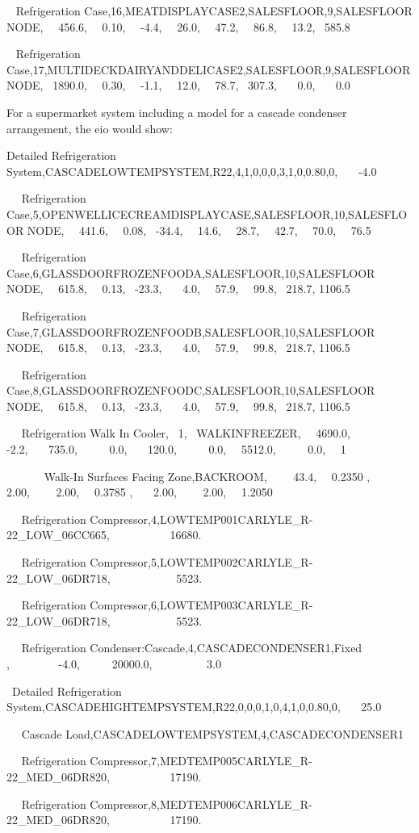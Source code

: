 ~ Refrigeration Case,16,MEATDISPLAYCASE2,SALESFLOOR,9,SALESFLOOR NODE,~~ 456.6,~~ 0.10,~~ -4.4,~~ 26.0,~~ 47.2,~~ 86.8,~~ 13.2,~ 585.8

~ Refrigeration Case,17,MULTIDECKDAIRYANDDELICASE2,SALESFLOOR,9,SALESFLOOR NODE,~ 1890.0,~~ 0.30,~~ -1.1,~~ 12.0,~~ 78.7,~ 307.3,~~~ 0.0,~~~ 0.0

For a supermarket system including a model for a cascade condenser arrangement, the eio would show:

Detailed Refrigeration System,CASCADELOWTEMPSYSTEM,R22,4,1,0,0,0,3,1,0,0.80,0,~~~ -4.0

~~ Refrigeration Case,5,OPENWELLICECREAMDISPLAYCASE,SALESFLOOR,10,SALESFLOOR NODE,~~ 441.6,~~ 0.08,~ -34.4,~~ 14.6,~~ 28.7,~~ 42.7,~~ 70.0,~~ 76.5

~~ Refrigeration Case,6,GLASSDOORFROZENFOODA,SALESFLOOR,10,SALESFLOOR NODE,~~ 615.8,~~ 0.13,~ -23.3,~~~ 4.0,~~ 57.9,~~ 99.8,~ 218.7, 1106.5

~~ Refrigeration Case,7,GLASSDOORFROZENFOODB,SALESFLOOR,10,SALESFLOOR NODE,~~ 615.8,~~ 0.13,~ -23.3,~~~ 4.0,~~ 57.9,~~ 99.8,~ 218.7, 1106.5

~~ Refrigeration Case,8,GLASSDOORFROZENFOODC,SALESFLOOR,10,SALESFLOOR NODE,~~ 615.8,~~ 0.13,~ -23.3,~~~ 4.0,~~ 57.9,~~ 99.8,~ 218.7, 1106.5

~~ Refrigeration Walk In Cooler,~ 1,~ WALKINFREEZER,~~ 4690.0,~~~~ -2.2,~~~ 735.0,~~~~~ 0.0,~~~ 120.0,~~~~~ 0.0,~~ 5512.0,~~~~~ 0.0,~~ 1

~~~~~~ Walk-In Surfaces Facing Zone,BACKROOM,~~~~ 43.4,~~ 0.2350 ,~~~ 2.00,~~~~ 2.00,~~ 0.3785 ,~~~ 2.00,~~~~ 2.00,~~ 1.2050

~~ Refrigeration Compressor,4,LOWTEMP001CARLYLE\_R-22\_LOW\_06CC665,~~~~~~~~~~ 16680.

~~ Refrigeration Compressor,5,LOWTEMP002CARLYLE\_R-22\_LOW\_06DR718,~~~~~~~~~~~ 5523.

~~ Refrigeration Compressor,6,LOWTEMP003CARLYLE\_R-22\_LOW\_06DR718,~~~~~~~~~~~ 5523.

~~ Refrigeration Condenser:Cascade,4,CASCADECONDENSER1,Fixed~ ,~~~~~~~~ -4.0,~~~~~ 20000.0,~~~~~~~~~ 3.0

~Detailed Refrigeration System,CASCADEHIGHTEMPSYSTEM,R22,0,0,0,1,0,4,1,0,0.80,0,~~~ 25.0

~~ Cascade Load,CASCADELOWTEMPSYSTEM,4,CASCADECONDENSER1

~~ Refrigeration Compressor,7,MEDTEMP005CARLYLE\_R-22\_MED\_06DR820,~~~~~~~~~~ 17190.

~~ Refrigeration Compressor,8,MEDTEMP006CARLYLE\_R-22\_MED\_06DR820,~~~~~~~~~~ 17190.

